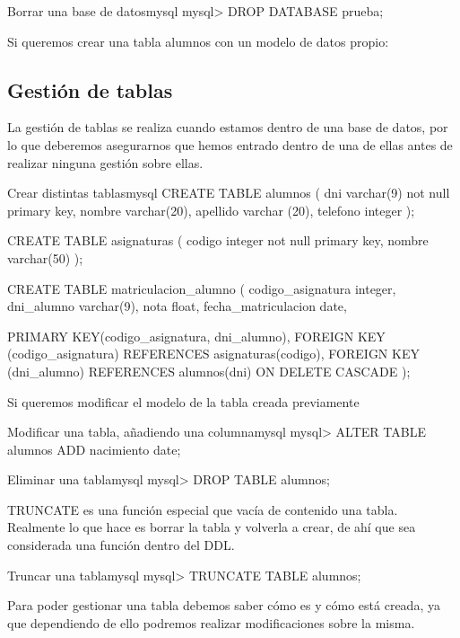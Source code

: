 \begin{mycode}{Borrar una base de datos}{mysql}{}
mysql> DROP DATABASE prueba;
\end{mycode}


Si queremos crear una tabla alumnos con un modelo de datos propio:
\subsection{Gestión de tablas}
La gestión de tablas se realiza cuando estamos dentro de una base de datos, por lo que deberemos asegurarnos que hemos entrado dentro de una de ellas antes de realizar ninguna gestión sobre ellas.



\begin{mycode}{Crear distintas tablas}{mysql}{}
CREATE TABLE alumnos (
    dni      varchar(9) not null primary key,
    nombre   varchar(20),
    apellido varchar (20),
    telefono integer
);

CREATE TABLE asignaturas (
    codigo integer not null primary key,
    nombre varchar(50)
);

CREATE TABLE matriculacion_alumno (
codigo_asignatura integer,
dni_alumno varchar(9),
nota float,
fecha_matriculacion date,

PRIMARY KEY(codigo_asignatura, dni_alumno),
FOREIGN KEY (codigo_asignatura) REFERENCES asignaturas(codigo),
FOREIGN KEY (dni_alumno) REFERENCES alumnos(dni) ON DELETE CASCADE
);
\end{mycode}

Si queremos modificar el modelo de la tabla creada previamente

\begin{mycode}{Modificar una tabla, añadiendo una columna}{mysql}{}
mysql> ALTER TABLE alumnos ADD nacimiento date;
\end{mycode}


\begin{mycode}{Eliminar una tabla}{mysql}{}
mysql> DROP TABLE alumnos;
\end{mycode}

TRUNCATE es una función especial que vacía de contenido una tabla. Realmente lo que hace es borrar la tabla y volverla a crear, de ahí que sea considerada una función dentro del DDL.

\begin{mycode}{Truncar una tabla}{mysql}{}
mysql> TRUNCATE TABLE alumnos;
\end{mycode}

Para poder gestionar una tabla debemos saber cómo es y cómo está creada, ya que dependiendo de ello podremos realizar modificaciones sobre la misma.


